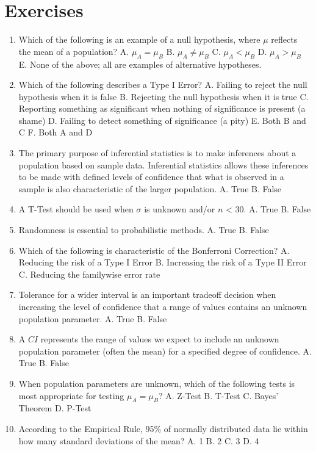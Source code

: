 \documentclass[]{book}
\begin{document}
\hypertarget{exercises-3}{%
\section{Exercises}\label{exercises-3}}

\begin{enumerate}
\def\labelenumi{\arabic{enumi}.}
\item
  Which of the following is an example of a null hypothesis, where \(\mu\) reflects the mean of a population?
  A. \(\mu_A = \mu_B\)
  B. \(\mu_A \neq \mu_B\)
  C. \(\mu_A < \mu_B\)
  D. \(\mu_A > \mu_B\)
  E. None of the above; all are examples of alternative hypotheses.
\item
  Which of the following describes a Type I Error?
  A. Failing to reject the null hypothesis when it is false
  B. Rejecting the null hypothesis when it is true
  C. Reporting something as significant when nothing of significance is present (a shame)
  D. Failing to detect something of significance (a pity)
  E. Both B and C
  F. Both A and D
\item
  The primary purpose of inferential statistics is to make inferences about a population based on sample data. Inferential statistics allows these inferences to be made with defined levels of confidence that what is observed in a sample is also characteristic of the larger population.
  A. True
  B. False
\item
  A T-Test should be used when \(\sigma\) is unknown and/or \(n\) \textless{} 30.
  A. True
  B. False
\item
  Randomness is essential to probabilistic methods.
  A. True
  B. False
\item
  Which of the following is characteristic of the Bonferroni Correction?
  A. Reducing the risk of a Type I Error
  B. Increasing the risk of a Type II Error
  C. Reducing the familywise error rate
\item
  Tolerance for a wider interval is an important tradeoff decision when increasing the level of confidence that a range of values contains an unknown population parameter.
  A. True
  B. False
\item
  A \(CI\) represents the range of values we expect to include an unknown population parameter (often the mean) for a specified degree of confidence.
  A. True
  B. False
\item
  When population parameters are unknown, which of the following tests is most appropriate for testing \(\mu_A = \mu_B\)?
  A. Z-Test
  B. T-Test
  C. Bayes' Theorem
  D. P-Test
\item
  According to the Empirical Rule, 95\% of normally distributed data lie within how many standard deviations of the mean?
  A. 1
  B. 2
  C. 3
  D. 4
\end{enumerate}
\end{document}
